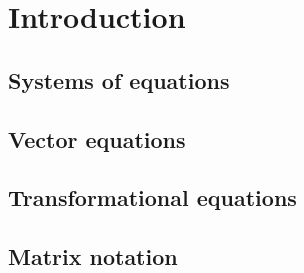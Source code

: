 
\chapter{Introduction}
\label{ch:intro}

\section{Systems of equations}
\label{sec:sys}

\section{Vector equations}
\label{sec:vect}

\section{Transformational equations}
\label{sec:trans}

\section{Matrix notation}
\label{sec:mat}
